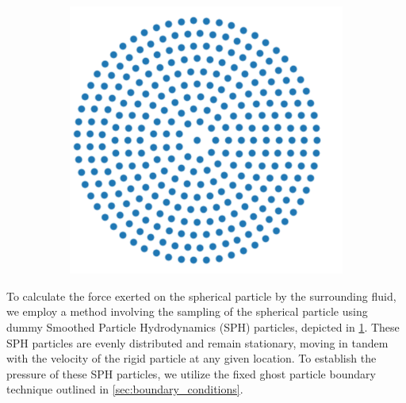 \documentclass[preprint,12pt]{elsarticle}
\begin{document}
\begin{figure}[!htpb]
\begin{subfigure}{0.24\textwidth}
    \includegraphics[width=1.0\textwidth]{images/rfc_explantion_schematic/sph_sampled_spherical_particles}
  \end{subfigure}
  \caption{}
\label{fig:real_particle_sph_sampling}
\end{figure}
To calculate the force exerted on the spherical particle by the surrounding
fluid, we employ a method involving the sampling of the spherical particle
using dummy Smoothed Particle Hydrodynamics (SPH) particles, depicted in
\cref{fig:real_particle_sph_sampling}. These SPH particles are evenly
distributed and remain stationary, moving in tandem with the velocity of the
rigid particle at any given location. To establish the pressure of these SPH
particles, we utilize the fixed ghost particle boundary technique outlined in
\cref{sec:boundary_conditions}.
\end{document}
